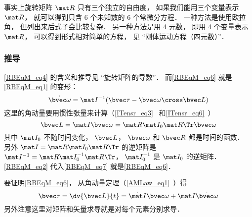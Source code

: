 事实上旋转矩阵 $\mat R$ 只有三个独立的自由度， 如果我们能用三个变量表示 $\mat R$， 就可以得到只含 6 个未知数的 6 个常微分方程． 一种方法是使用欧拉角， 但列出来后式子会比较复杂． 另一种方法是用 4 元数， 即用 4 个变量表示 $\mat R$， 可以得到形式相对简单的方程， 见 “刚体运动方程（四元数）”．


\subsubsection{推导}
\autoref{RBEqM_eq4} 的含义和推导见 “旋转矩阵的导数”． 而\autoref{RBEqM_eq6} 就是\autoref{RBEqM_eq1} 的变形：
\begin{equation}\label{RBEqM_eq7}
\dot{\bvec \omega} = \mat I^{-1} (\bvec\tau - \bvec\omega\cross\bvec L)
\end{equation}
这里的角动量要用惯性张量来计算（\autoref{ITensr_eq3}~ 和\autoref{ITensr_eq6}~）
\begin{equation}\label{RBEqM_eq2}
\bvec L = \mat I \bvec \omega = \mat R \mat I_0 \mat R\Tr \bvec \omega
\end{equation}
其中 $\mat I_0$ 不随时间变化， $\bvec L$， $\bvec \omega$ 和 $\bvec R$ 都是时间的函数． 另外 $\mat I = \mat R \mat I_0 \mat R\Tr$ 的逆矩阵是 $\mat I^{-1} = \mat R \mat I_0^{-1} \mat R\Tr$， $\mat I_0^{-1}$ 是 $\mat I_0$ 的逆矩阵． \autoref{RBEqM_eq2} 代入\autoref{RBEqM_eq7} 就是\autoref{RBEqM_eq6}．

要证明\autoref{RBEqM_eq6}， 从角动量定理（\autoref{AMLaw_eq1}~）得
\begin{equation}\label{RBEqM_eq3}
\bvec \tau = \dv{\bvec L}{t} = \dot{\mat I} \bvec\omega + \mat I \dot{\bvec\omega}
\end{equation}
另外注意这里对矩阵和矢量求导就是对每个元素分别求导．


